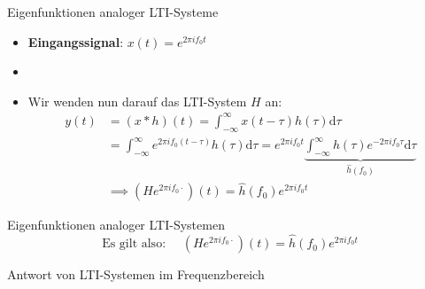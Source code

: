 \documentclass[14pt, aspectratio=169, handout]{beamer}
\begin{document}
\begin{frame}{Eigenfunktionen analoger LTI-Systeme}
    \begin{itemize}
        \item \textbf{Eingangssignal}: $x(t)= e^{2\pi i f_0 t}$
        \item[] 
        \item[] Wir wenden nun darauf das LTI-System $H$ an:
        \begin{align*}
            y(t) &= (x \ast h)(t) = \int_{-\infty}^\infty x(t-\tau)h(\tau) \text{d}\tau \\
            &=\int_{-\infty}^\infty e^{2 \pi i f_0 (t-\tau)} h(\tau) \text{d}\tau = e^{2 \pi i f_0 t} \underbrace{\int_{-\infty}^\infty h(\tau) e^{-2\pi i f_0 \tau} \text{d}\tau}_{\hat{h}(f_0)} \\
            &\implies (He^{2 \pi i f_0 \cdot})(t) = \hat{h}(f_0)e^{2 \pi i f_0 t}
        \end{align*}
    \end{itemize}
\end{frame}

\begin{frame}{Eigenfunktionen analoger LTI-Systemen}
    $$\text{Es gilt also: } \hspace{12pt} (He^{2 \pi i f_0 \cdot})(t) = \hat{h}(f_0)e^{2 \pi i f_0 t}$$
    \vspace{0.25cm}
\end{frame}

\begin{frame}{Antwort von LTI-Systemen im Frequenzbereich}
    
\end{frame}
\end{document}
